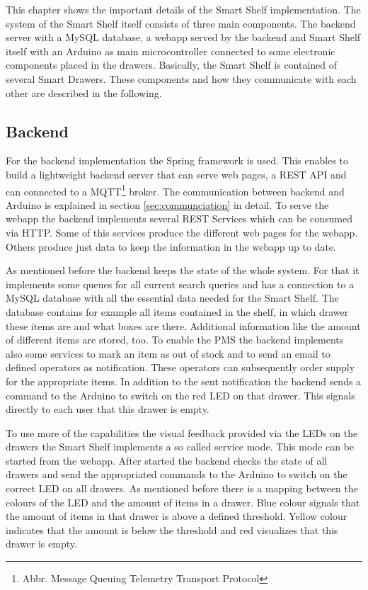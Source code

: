 This chapter shows the important details of the Smart Shelf implementation. 
The system of the Smart Shelf itself consists of three main components. 
The backend server with a MySQL database, a webapp served by the backend and Smart Shelf itself with an Arduino as main microcontroller connected to some electronic components placed in the drawers. 
Basically, the Smart Shelf is contained of several Smart Drawers. 
These components and how they communicate with each other are described in the following. 

\subsection{Backend}
For the backend implementation the Spring framework is used. 
This enables to build a lightweight backend server that can serve web pages, a REST API and can connected to a MQTT\footnote{Abbr. Message Queuing Telemetry Transport Protocol} broker. 
The communication between backend and Arduino is explained in section \ref{sec:communciation} in detail. 
To serve the webapp the backend implements several REST Services which can be consumed via HTTP. 
Some of this services produce the different web pages for the webapp. 
Others produce just data to keep the information in the webapp up to date. 

As mentioned before the backend keeps the state of the whole system. 
For that it implements some queues for all current search queries and has a connection to a MySQL database with all the essential data needed for the Smart Shelf. 
The database contains for example all items contained in the shelf, in which drawer these items are and what boxes are there. 
Additional information like the amount of different items are stored, too. 
To enable the PMS the backend implements also some services to mark an item as out of stock and to send an email to defined operators as notification. 
These operators can subsequently order supply for the appropriate items. 
In addition to the sent notification the backend sends a command to the Arduino to switch on the red LED on that drawer. 
This signals directly to each user that this drawer is empty. 

To use more of the capabilities the visual feedback provided via the LEDs on the drawers the Smart Shelf implements a so called service mode. 
This mode can be started from the webapp. 
After started the backend checks the state of all drawers and send the appropriated commands to the Arduino to switch on the correct LED on all drawers. 
As mentioned before there is a mapping between the colours of the LED and the amount of items in a drawer. 
Blue colour signals that the amount of items in that drawer is above a defined threshold. 
Yellow colour indicates that the amount is below the threshold and red visualizes that this drawer is empty. 

